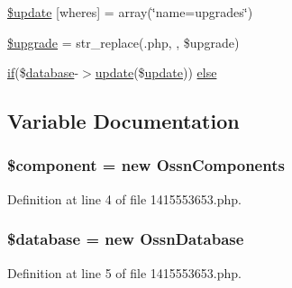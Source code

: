 \begin{DoxyCompactItemize}
\item 
\hyperlink{1415553653_8php_aacde4479a904b32d0f24dea4e01f148c}{\$update} \mbox{[}\textquotesingle{}wheres\textquotesingle{}\mbox{]} = array(\char`\"{}name=\textquotesingle{}upgrades\textquotesingle{}\char`\"{})
\item 
\hyperlink{1415553653_8php_a9084097ce600d3cc7a79a20ecaea9906}{\$upgrade} = str\+\_\+replace(\textquotesingle{}.php\textquotesingle{}, \textquotesingle{}\textquotesingle{}, \$upgrade)
\item 
\hyperlink{jquery_8tokeninput_8js_ad8dd46a3cbc004569e34401e9e71771a}{if}(\$\hyperlink{ossn_8config_8db_8example_8php_a4e0ca996705612048240f76ff8d4da95}{database}-\/$>$\hyperlink{_chart_8_doughnut_8js_ad58a8121caa8678969d1ff32848a77c4}{update}(\$\hyperlink{_chart_8_doughnut_8js_ad58a8121caa8678969d1ff32848a77c4}{update})) \hyperlink{1415553653_8php_aa7c58ee9f19ec0c0f3a1951839273e79}{else}
\end{DoxyCompactItemize}


\subsection{Variable Documentation}
\subsubsection[{\texorpdfstring{\$component}{$component}}]{\setlength{\rightskip}{0pt plus 5cm}\$component = new {\bf Ossn\+Components}}\hypertarget{1415553653_8php_a211527c21ba56109545060b49b628e59}{}\label{1415553653_8php_a211527c21ba56109545060b49b628e59}


Definition at line 4 of file 1415553653.\+php.

\subsubsection[{\texorpdfstring{\$database}{$database}}]{\setlength{\rightskip}{0pt plus 5cm}\${\bf database} = new {\bf Ossn\+Database}}\hypertarget{1415553653_8php_a7691c0162d89de0b6ba47edcd8ba8878}{}\label{1415553653_8php_a7691c0162d89de0b6ba47edcd8ba8878}


Definition at line 5 of file 1415553653.\+php.


